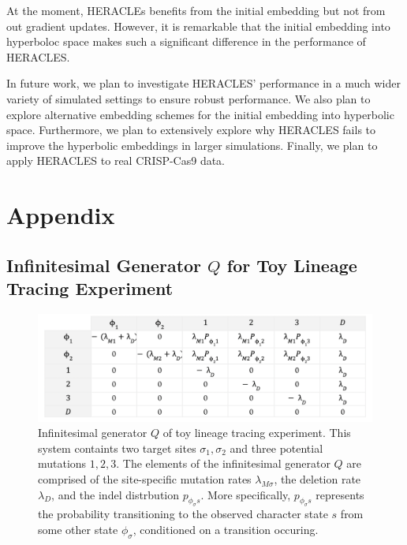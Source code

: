 \documentclass{article}
\begin{document}
At the moment, HERACLEs benefits from the initial embedding but not from out gradient updates. However, it is remarkable that the initial embedding into hyperboloc space makes such a significant difference in the performance of HERACLES.

In future work, we plan to investigate HERACLES' performance in a much wider variety of simulated settings to ensure robust performance. We also plan to explore alternative embedding schemes for the initial embedding into hyperbolic space. Furthermore, we plan to extensively explore why HERACLES fails to improve the hyperbolic embeddings in larger simulations. Finally, we plan to apply HERACLES to real CRISP-Cas9 data.




\section*{Appendix}

\subsection*{Infinitesimal Generator $Q$ for Toy Lineage Tracing Experiment}

\begin{figure}[h]
  \label{fig:Q}
  \includegraphics[width=\linewidth]{images/Q.png}
  \caption{Infinitesimal generator $Q$ of toy lineage tracing experiment.  This system containts two target sites $\sigma_1, \sigma_2$ and three potential mutations $1,2,3$. The elements of the infinitesimal generator $Q$ are comprised of the site-specific mutation rates $\lambda_{M \sigma}$, the deletion rate $\lambda_D$, and the indel distrbution $p_{\phi_\sigma s}$. More specifically, $p_{\phi_\sigma s}$ represents the probability transitioning to the observed character state $s$ from some other state $\phi_\sigma$, conditioned on a transition occuring.}
\end{figure}
\end{document}

